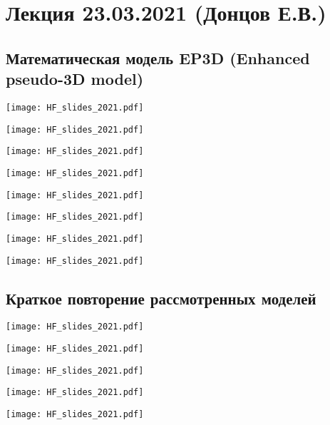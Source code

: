 \documentclass[main.tex]{subfiles}
\begin{document}

\section{Лекция 23.03.2021 (Донцов Е.В.)}

\subsection{Математическая модель EP3D (Enhanced pseudo-3D model)}

\texttt{[image: HF\_slides\_2021.pdf]}

\texttt{[image: HF\_slides\_2021.pdf]}

\texttt{[image: HF\_slides\_2021.pdf]}

\texttt{[image: HF\_slides\_2021.pdf]}

\texttt{[image: HF\_slides\_2021.pdf]}

\texttt{[image: HF\_slides\_2021.pdf]}

\texttt{[image: HF\_slides\_2021.pdf]}

\texttt{[image: HF\_slides\_2021.pdf]}

\subsection{Краткое повторение рассмотренных моделей}

\texttt{[image: HF\_slides\_2021.pdf]}

\texttt{[image: HF\_slides\_2021.pdf]}

\texttt{[image: HF\_slides\_2021.pdf]}

\texttt{[image: HF\_slides\_2021.pdf]}

\texttt{[image: HF\_slides\_2021.pdf]}
\end{document}
